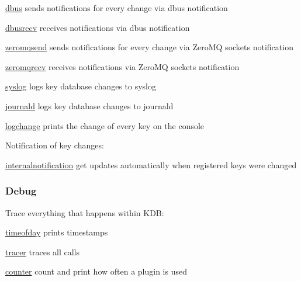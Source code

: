 \begin{DoxyItemize}
\item \hyperlink{md_src_plugins_dbus_README_src_plugins_dbus_README_md}{dbus} sends notifications for every change via dbus {\ttfamily notification}
\item \hyperlink{md_src_plugins_dbusrecv_README_src_plugins_dbusrecv_README_md}{dbusrecv} receives notifications via dbus {\ttfamily notification}
\item \hyperlink{md_src_plugins_zeromqsend_README_src_plugins_zeromqsend_README_md}{zeromqsend} sends notifications for every change via Zero\+MQ sockets {\ttfamily notification}
\item \hyperlink{md_src_plugins_zeromqrecv_README_src_plugins_zeromqrecv_README_md}{zeromqrecv} receives notifications via Zero\+MQ sockets {\ttfamily notification}
\item \hyperlink{md_src_plugins_syslog_README_src_plugins_syslog_README_md}{syslog} logs key database changes to syslog
\item \hyperlink{md_src_plugins_journald_README_src_plugins_journald_README_md}{journald} logs key database changes to journald
\item \hyperlink{md_src_plugins_logchange_README_src_plugins_logchange_README_md}{logchange} prints the change of every key on the console
\end{DoxyItemize}

Notification of key changes\+:


\begin{DoxyItemize}
\item \hyperlink{md_src_plugins_internalnotification_README_src_plugins_internalnotification_README_md}{internalnotification} get updates automatically when registered keys were changed
\end{DoxyItemize}

\subsubsection*{Debug}

Trace everything that happens within K\+DB\+:


\begin{DoxyItemize}
\item \hyperlink{md_src_plugins_timeofday_README_src_plugins_timeofday_README_md}{timeofday} prints timestamps
\item \hyperlink{md_src_plugins_tracer_README_src_plugins_tracer_README_md}{tracer} traces all calls
\item \hyperlink{md_src_plugins_counter_README_src_plugins_counter_README_md}{counter} count and print how often a plugin is used
\end{DoxyItemize}

